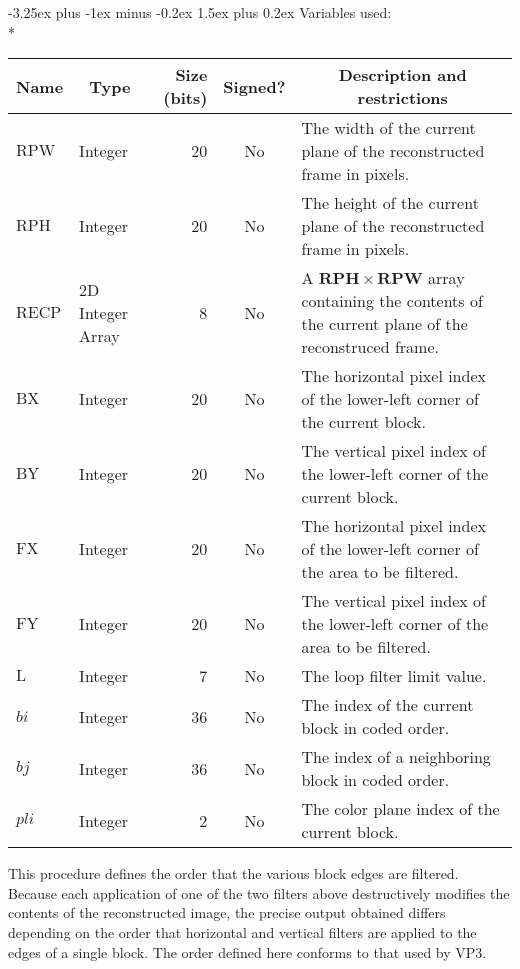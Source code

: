 \documentclass[9pt,letterpaper]{book}
\makeatletter
\newcommand{\idx}[1]{{\ensuremath{\mathit{#1}}}}
\newcommand{\pli}{\idx{pli}}
\newcommand{\bi}{\idx{bi}}
\newcommand{\bj}{\idx{bj}}
\newcommand{\bitvar}[1]{\ensuremath{\mathbf{\bm{#1}}}}
\newcommand{\locvar}[1]{\ensuremath{\mathrm{#1}}}
\numberwithin{equation}{chapter}
\numberwithin{figure}{chapter}
\numberwithin{table}{chapter}
\renewcommand{\paragraph}{\@startsection{paragraph}{4}{0ex}%
 {-3.25ex plus -1ex minus -0.2ex}%
 {1.5ex plus 0.2ex}%
 {\normalfont\normalsize\bfseries}}
\makeatother
\begin{document}
\paragraph{Variables used:}\hfill\\*
\begin{tabularx}{\textwidth}{@{}llrcX@{}}\toprule
\multicolumn{1}{c}{Name} &
\multicolumn{1}{c}{Type} &
\multicolumn{1}{p{30pt}}{\centering Size (bits)} &
\multicolumn{1}{c}{Signed?} &
\multicolumn{1}{c}{Description and restrictions} \\\midrule\endhead
\locvar{RPW}       & Integer & 20 & No  & The width of the current plane of the
 reconstructed frame in pixels. \\
\locvar{RPH}       & Integer & 20 & No  & The height of the current plane of
 the reconstructed frame in pixels. \\
\locvar{RECP}      & \multicolumn{1}{p{50pt}}{2D Integer Array} &
                                8 & No  & A $\bitvar{RPH}\times\bitvar{RPW}$
 array containing the contents of the current plane of the reconstruced
 frame. \\
\locvar{BX}        & Integer & 20 & No  & The horizontal pixel index of the
 lower-left corner of the current block. \\
\locvar{BY}        & Integer & 20 & No  & The vertical pixel index of the
 lower-left corner of the current block. \\
\locvar{FX}        & Integer & 20 & No  & The horizontal pixel index of the
 lower-left corner of the area to be filtered. \\
\locvar{FY}        & Integer & 20 & No  & The vertical pixel index of the
 lower-left corner of the area to be filtered. \\
\locvar{L}         & Integer &  7 & No  & The loop filter limit value. \\
\locvar{\bi}       & Integer & 36 & No  & The index of the current block in
 coded order. \\
\locvar{\bj}       & Integer & 36 & No  & The index of a neighboring block in
 coded order. \\
\locvar{\pli}      & Integer &  2 & No  & The color plane index of the current
 block. \\
\bottomrule\end{tabularx}
\medskip

This procedure defines the order that the various block edges are filtered.
Because each application of one of the two filters above destructively modifies
 the contents of the reconstructed image, the precise output obtained differs
 depending on the order that horizontal and vertical filters are applied to the
 edges of a single block.
The order defined here conforms to that used by VP3.
\end{document}
